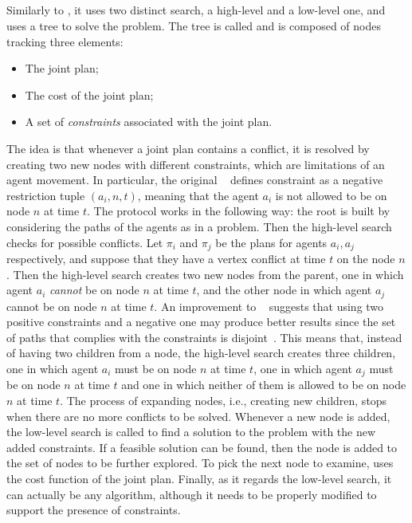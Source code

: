 \subsection{}
Similarly to , it uses two distinct search, a high-level and a
low-level one, and uses a tree to solve the  problem. \newline
The  tree is called  and is composed of nodes tracking three
elements: 
\begin{itemize}
  \item The joint plan; 
  \item The cost of the joint plan;
  \item A set of \textit{constraints} associated with the joint plan.
\end{itemize}
The idea is that whenever a joint plan contains a conflict, it is resolved by
creating two new nodes with different constraints, which are limitations of an
agent movement. In particular, the original ~\cite{CBS} defines
constraint as a negative restriction tuple $(a_i, n, t)$, meaning that the
agent $a_i$ is not allowed to be on node $n$ at time $t$. \newline
The protocol works in the following way: the root is built by considering the
paths of the agents as in a  problem. Then the high-level search
checks for possible conflicts. Let $\pi_i$ and $\pi_j$ be the plans for agents
$a_i, a_j$ respectively, and suppose that they have a vertex conflict at time
$t$ on the node $n$. Then the high-level search creates two new  nodes
from the parent, one in which agent $a_i$ \textit{cannot} be on node $n$ at
time $t$, and the other  node in which agent $a_j$ cannot be on node
$n$ at time $t$. \newline
An improvement to ~\cite{ICBS} suggests that using two positive
constraints and a negative one may produce better results since the set of
paths that complies with the constraints is disjoint~\cite{MAPF_overview}. This
means that, instead of having two children from a node, the high-level search
creates three children, one in which agent $a_i$ must be on node $n$ at time
$t$, one in which agent $a_j$ must be on node $n$ at time $t$ and one in which
neither of them is allowed to be on node $n$ at time $t$. \newline
The process of expanding nodes, i.e., creating new children, stops when there
are no more conflicts to be solved. \newline
Whenever a new node is added, the low-level search is called to find a solution
to the problem with the new added constraints. If a feasible solution can be
found, then the node is added to the set of nodes to be further explored. To
pick the next node to examine,  uses the cost function of the joint
plan. \newline
Finally, as it regards the low-level search, it can actually be any 
algorithm, although it needs to be properly modified to support the presence of
constraints. 
%
